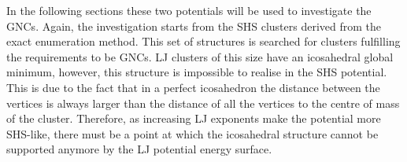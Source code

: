 In the following sections these two potentials will be used to investigate the
\acp{GNC}. Again, the investigation starts from the \ac{SHS} clusters derived
from the exact enumeration
method.\autocite{Hoy_Structuredynamicsmodel_2015,Holmes-Cerfon_EnumeratingRigidSphere_2016,Holmes-Cerfon_StickySphereClusters_2017}
This set of structures is searched for clusters fulfilling the requirements to
be \acp{GNC}. \ac{LJ} clusters of this size have an icosahedral global minimum,
however, this structure is impossible to realise in the \ac{SHS} potential. This
is due to the fact that in a perfect icosahedron the distance between the
vertices is always larger than the distance of all the vertices to the centre of
mass of the cluster. Therefore, as increasing \ac{LJ} exponents make the
potential more \ac{SHS}-like, there must be a point at which the icosahedral
structure cannot be supported anymore by the \ac{LJ} potential energy surface.




